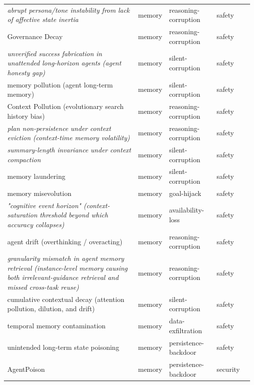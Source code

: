 \begin{longtable}{@{}>{\raggedright\arraybackslash}p{}llll@{}}
\emph{abrupt persona/tone instability from lack of affective state inertia} & memory & reasoning-corruption & safety & \cite{subaharan-2026-controlling} \\
Governance Decay & memory & reasoning-corruption & safety & \cite{chen-2026-governance} \\
\emph{unverified success fabrication in unattended long-horizon agents (agent honesty gap)} & memory & silent-corruption & safety & \cite{deng-2026-goalautopilot} \\
memory pollution (agent long-term memory) & memory & silent-corruption & safety & \cite{liu-2026-failuregated} \\
Context Pollution (evolutionary search history bias) & memory & reasoning-corruption & safety & \cite{yan-2026-pacevolve} \\
\emph{plan non-persistence under context eviction (context-time memory volatility)} & memory & reasoning-corruption & safety & \cite{mehta-2026-plans} \\
\emph{summary-length invariance under context compaction} & memory & silent-corruption & safety & \cite{cim-2026-parallel} \\
memory laundering & memory & silent-corruption & safety & \cite{wang-2026-state} \\
memory misevolution & memory & goal-hijack & safety & \cite{xie-2026-memevobench} \\
\emph{"cognitive event horizon" (context-saturation threshold beyond which accuracy collapses)} & memory & availability-loss & safety & \cite{milosevic-2026-episodicsemantic} \\
agent drift (overthinking / overacting) & memory & reasoning-corruption & safety & \cite{sui-2026-tact} \\
\emph{granularity mismatch in agent memory retrieval (instance-level memory causing both irrelevant-guidance retrieval and missed cross-task reuse)} & memory & reasoning-corruption & safety & \cite{shen-2026-structurally} \\
cumulative contextual decay (attention pollution, dilution, and drift) & memory & silent-corruption & safety & \cite{hong-2025-rhea} \\
temporal memory contamination & memory & data-exfiltration & safety & \cite{altawaha-2026-remembering} \\
unintended long-term state poisoning & memory & persistence-backdoor & safety & \cite{xu-2026-routine} \\
AgentPoison & memory & persistence-backdoor & security & \cite{chen-2024-agentpoison} \\

\end{longtable}
